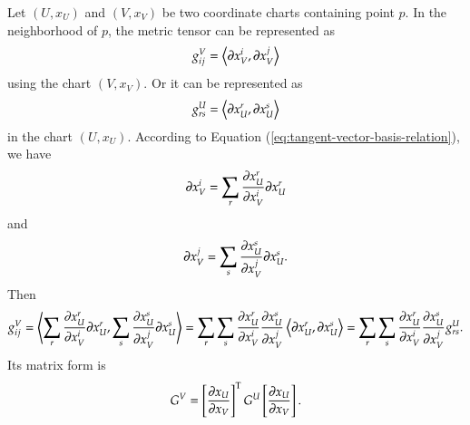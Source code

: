 \documentclass[11pt, a4paper]{book}
\begin{document}
Let $(U,x_U)$ and $(V,x_V)$ be two coordinate charts containing point $p$. In the
neighborhood of $p$, the metric tensor can be represented as
\begin{equation*}
  g_{ij}^V = \left\langle \boldsymbol{\partial}x_V^i, \boldsymbol{\partial}x_V^j \right\rangle
\end{equation*}
using the chart $(V,x_V)$. Or it can be represented as
\begin{equation*}
  g_{rs}^U = \left\langle \boldsymbol{\partial}x_U^r, \boldsymbol{\partial}x_U^s \right\rangle
\end{equation*}
in the chart $(U,x_U)$. According to Equation (\ref{eq:tangent-vector-basis-relation}), we
have
\begin{equation*}
  \boldsymbol{\partial}x_V^i = \sum_r \frac{\partial x_U^r}{\partial x_V^i} \boldsymbol{\partial}x_U^r
\end{equation*}
and
\begin{equation*}
  \boldsymbol{\partial}x_V^j = \sum_s \frac{\partial x_U^s}{\partial x_V^j} \boldsymbol{\partial}x_U^s.
\end{equation*}
Then
\begin{equation}
  \label{eq:metric-tensor-transformation}
  g_{ij}^V = \left\langle \sum_r \frac{\partial x_U^r}{\partial x_V^i} \boldsymbol{\partial}x_U^r,
    \sum_s \frac{\partial x_U^s}{\partial x_V^j} \boldsymbol{\partial}x_U^s \right\rangle =
  \sum_r\sum_s \frac{\partial x_U^r}{\partial x_V^i} \frac{\partial x_U^s}{\partial x_V^j}
  \left\langle \boldsymbol{\partial}x_U^r, \boldsymbol{\partial}x_U^s \right\rangle = \sum_r\sum_s
  \frac{\partial x_U^r}{\partial x_V^i} \frac{\partial x_U^s}{\partial x_V^j} g_{rs}^U.
\end{equation}
Its matrix form is
\begin{equation}
  \label{eq:metric-tensor-transformation-matrix-form}
  G^V = \left[ \frac{\partial x_U}{\partial x_V} \right]^{\mathrm{T}} G^U \left[ \frac{\partial
      x_U}{\partial x_V} \right].
\end{equation}
\end{document}
